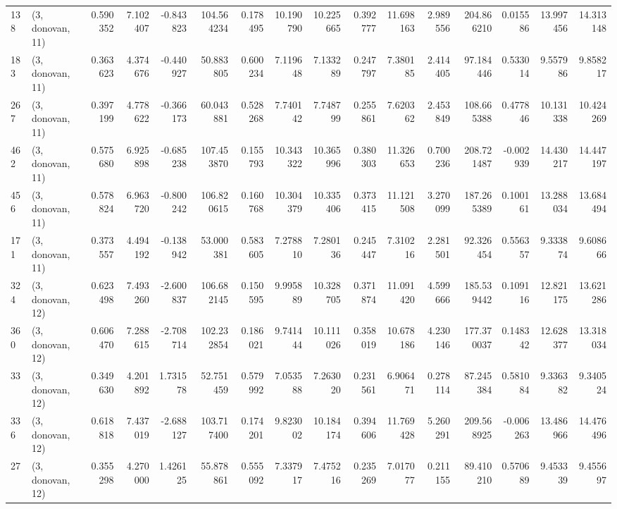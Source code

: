 \begin{tabular}{llrrrrrrrrrrrrrr}
138 &  (3, donovan, 11) &   0.590352 &   7.102407 &  -0.843823 &   104.564234 &   0.178495 &  10.190790 &  10.225665 &  0.392777 &  11.698163 &   2.989556 &   204.866210 &   0.015586 &  13.997456 &  14.313148 \\
183 &  (3, donovan, 11) &   0.363623 &   4.374676 &  -0.440927 &    50.883805 &   0.600234 &   7.119648 &   7.133289 &  0.247797 &   7.380185 &   2.414405 &    97.184446 &   0.533014 &   9.557986 &   9.858217 \\
267 &  (3, donovan, 11) &   0.397199 &   4.778622 &  -0.366173 &    60.043881 &   0.528268 &   7.740142 &   7.748799 &  0.255861 &   7.620362 &   2.453849 &   108.665388 &   0.477846 &  10.131338 &  10.424269 \\
462 &  (3, donovan, 11) &   0.575680 &   6.925898 &  -0.685238 &   107.453870 &   0.155793 &  10.343322 &  10.365996 &  0.380303 &  11.326653 &   0.700236 &   208.721487 &  -0.002939 &  14.430217 &  14.447197 \\
456 &  (3, donovan, 11) &   0.578824 &   6.963720 &  -0.800242 &   106.820615 &   0.160768 &  10.304379 &  10.335406 &  0.373415 &  11.121508 &   3.270099 &   187.265389 &   0.100161 &  13.288034 &  13.684494 \\
171 &  (3, donovan, 11) &   0.373557 &   4.494192 &  -0.138942 &    53.000381 &   0.583605 &   7.278810 &   7.280136 &  0.245447 &   7.310216 &   2.281501 &    92.326454 &   0.556357 &   9.333874 &   9.608666 \\
324 &  (3, donovan, 12) &   0.623498 &   7.493260 &  -2.600837 &   106.682145 &   0.150595 &   9.995889 &  10.328705 &  0.371874 &  11.091420 &   4.599666 &   185.539442 &   0.109116 &  12.821175 &  13.621286 \\
360 &  (3, donovan, 12) &   0.606470 &   7.288615 &  -2.708714 &   102.232854 &   0.186021 &   9.741444 &  10.111026 &  0.358019 &  10.678186 &   4.230146 &   177.370037 &   0.148342 &  12.628377 &  13.318034 \\
33  &  (3, donovan, 12) &   0.349630 &   4.201892 &   1.731578 &    52.751459 &   0.579992 &   7.053588 &   7.263020 &  0.231561 &   6.906471 &   0.278114 &    87.245384 &   0.581084 &   9.336382 &   9.340524 \\
336 &  (3, donovan, 12) &   0.618818 &   7.437019 &  -2.688127 &   103.717400 &   0.174201 &   9.823002 &  10.184174 &  0.394606 &  11.769428 &   5.260291 &   209.568925 &  -0.006263 &  13.486966 &  14.476496 \\
27  &  (3, donovan, 12) &   0.355298 &   4.270000 &   1.426125 &    55.878861 &   0.555092 &   7.337917 &   7.475216 &  0.235269 &   7.017077 &   0.211155 &    89.410210 &   0.570689 &   9.453339 &   9.455697 \\

\end{tabular}
